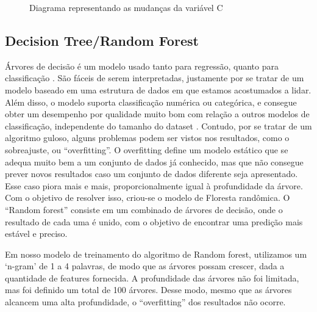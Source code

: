 \begin{figure}[!htb]
    \caption{\label{fig:my-label} Diagrama representando as mudanças da variável C}
\end{figure}

\subsection{Decision Tree/Random Forest}

Árvores de decisão é um modelo usado tanto para regressão, quanto para classificação \cite{decision-tree}. São fáceis de serem interpretadas, justamente por se tratar de um modelo baseado em uma estrutura de dados em que estamos acostumados a lidar. Além disso, o modelo suporta classificação numérica ou categórica, e consegue obter um desempenho por qualidade muito bom com relação a outros modelos de classificação, independente do tamanho do dataset \cite{performance-comparison}. Contudo, por se tratar de um algoritmo guloso, alguns problemas podem ser vistos nos resultados, como o sobreajuste, ou “overfitting”. O overfitting define um modelo estático que se adequa muito bem a um conjunto de dados já conhecido, mas que não consegue prever novos resultados caso um conjunto de dados diferente seja apresentado. Esse caso piora mais e mais, proporcionalmente igual à profundidade da árvore.  Com o objetivo de resolver isso, criou-se o modelo de Floresta randômica. O “Random forest” consiste em um combinado de árvores de decisão, onde o resultado de cada uma é unido, com o objetivo de encontrar uma predição mais estável e preciso.

Em nosso modelo de treinamento do algoritmo de Random forest, utilizamos um ‘n-gram’ de 1 a 4 palavras, de modo que as árvores possam crescer, dada a quantidade de features fornecida. A profundidade das árvores não foi limitada, mas foi definido um total de 100 árvores. Desse modo, mesmo que as árvores alcancem uma alta profundidade, o “overfitting” dos resultados não ocorre.

